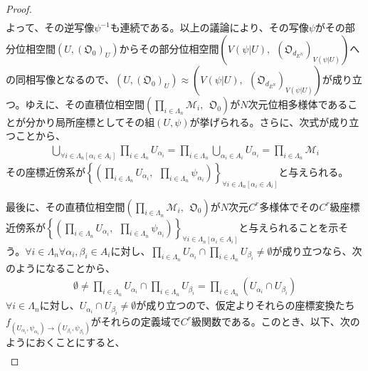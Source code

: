 \documentclass[dvipdfmx]{jsarticle}
\begin{document}
\begin{proof}
\begin{align*}
\end{align*}
よって、その逆写像$\psi^{- 1}$も連続である。以上の議論により、その写像$\psi$がその部分位相空間$\left( U,\left( \mathfrak{O}_{0} \right)_{U} \right)$からその部分位相空間$\left( V\left( \psi|U \right),\ \ \left( \mathfrak{O}_{d_{E^{N}}} \right)_{V\left( \psi|U \right)} \right)$への同相写像となるので、$\left( U,\left( \mathfrak{O}_{0} \right)_{U} \right) \approx \left( V\left( \psi|U \right),\ \ \left( \mathfrak{O}_{d_{E^{N}}} \right)_{V\left( \psi|U \right)} \right)$が成り立つ。ゆえに、その直積位相空間$\left( \prod_{i \in \varLambda_{n}} \mathcal{M}_{i},\ \ \mathfrak{O}_{0} \right)$が$N$次元位相多様体であることが分かり局所座標としてその組$(U,\psi)$が挙げられる。さらに、次式が成り立つことから、
\begin{align*}
\bigcup_{\forall i \in \varLambda_{n}\left[ \alpha_{i} \in A_{i} \right]} {\prod_{i \in \varLambda_{n}} U_{\alpha_{i}}} = \prod_{i \in \varLambda_{n}} {\bigcup_{\alpha_{i} \in A_{i}} U_{\alpha_{i}}} = \prod_{i \in \varLambda_{n}} \mathcal{M}_{i}
\end{align*}
その座標近傍系が$\left\{ \left( \prod_{i \in \varLambda_{n}} U_{\alpha_{i}},\ \ \prod_{i \in \varLambda_{n}} \psi_{\alpha_{i}} \right) \right\}_{\forall i \in \varLambda_{n}\left[ \alpha_{i} \in A_{i} \right]}$と与えられる。\par
最後に、その直積位相空間$\left( \prod_{i \in \varLambda_{n}} \mathcal{M}_{i},\ \ \mathfrak{O}_{0} \right)がN$次元$C^{r}$多様体でその$C^{r}$級座標近傍系が$\left\{ \left( \prod_{i \in \varLambda_{n}} U_{\alpha_{i}},\ \ \prod_{i \in \varLambda_{n}} \psi_{\alpha_{i}} \right) \right\}_{\forall i \in \varLambda_{n}\left[ \alpha_{i} \in A_{i} \right]}$と与えられることを示そう。$\forall i \in \varLambda_{n}\forall\alpha_{i},\beta_{i} \in A_{i}$に対し、$\prod_{i \in \varLambda_{n}} U_{\alpha_{i}} \cap \prod_{i \in \varLambda_{n}} U_{\beta_{i}} \neq \emptyset$が成り立つなら、次のようになることから、
\begin{align*}
\emptyset \neq \prod_{i \in \varLambda_{n}} U_{\alpha_{i}} \cap \prod_{i \in \varLambda_{n}} U_{\beta_{i}} = \prod_{i \in \varLambda_{n}} \left( U_{\alpha_{i}} \cap U_{\beta_{i}} \right)
\end{align*}
$\forall i \in \varLambda_{n}$に対し、$U_{\alpha_{i}} \cap U_{\beta_{i}} \neq \emptyset$が成り立つので、仮定よりそれらの座標変換たち$f_{\left( U_{\alpha_{i}},\psi_{\alpha_{i}} \right) \rightarrow \left( U_{\beta_{i}},\psi_{\beta_{i}} \right)}$がそれらの定義域で$C^{r}$級関数である。このとき、以下、次のようにおくことにすると、
\begin{align*}

\end{align*}
\end{proof}
\end{document}
